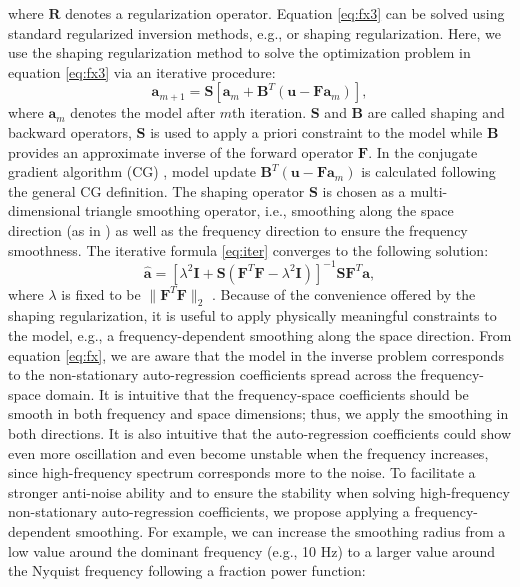 where $\mathbf{R}$ denotes a regularization operator. Equation \ref{eq:fx3} can be solved using standard regularized inversion methods, e.g., \cite{tikhonov1963} or shaping \cite[]{fomel2007shape} regularization. Here, we use the shaping regularization method to solve the optimization problem in equation \ref{eq:fx3} via an iterative procedure:
 \begin{equation}
\label{eq:iter}
\mathbf{a}_{m+1} = \mathbf{S}[\mathbf{a}_m + \mathbf{B}^T(\mathbf{u}-\mathbf{Fa}_m)] ,
\end{equation}
where $\mathbf{a}_{m}$ denotes the model after $m$th iteration. $\mathbf{S}$ and $\mathbf{B}$ are called shaping and backward operators, $\mathbf{S}$ is used to apply a priori constraint to the model while  $\mathbf{B}$ provides an approximate inverse of the forward operator $\mathbf{F}$. In the conjugate gradient algorithm (CG) \cite[]{fomel2007shape}, model update $\mathbf{B}^T(\mathbf{u}-\mathbf{Fa}_m)$ is calculated following the general CG definition. The shaping operator $\mathbf{S}$ is chosen as a multi-dimensional triangle smoothing operator, i.e., smoothing along the space direction (as in \cite{guochang2012}) as well as the frequency direction to ensure the frequency smoothness. The iterative formula  \ref{eq:iter} converges to the following solution:
\begin{equation}
\label{eq:fx33}
\hat{\mathbf{a}} = [\lambda^2\mathbf{I} + \mathbf{S}(\mathbf{F}^T\mathbf{F}-\lambda^2\mathbf{I}) ]^{-1}\mathbf{S}\mathbf{F}^T\mathbf{a},
\end{equation}
where $\lambda$ is fixed to be $\parallel\mathbf{F}^T\mathbf{F}\parallel_2$ \cite[]{fomel2007shape}. Because of the convenience offered by the shaping regularization, it is useful to apply physically meaningful constraints to the model, e.g., a frequency-dependent smoothing along the space direction. From equation \ref{eq:fx}, we are aware that the model in the inverse problem corresponds to the non-stationary auto-regression coefficients spread across the frequency-space domain. It is intuitive that the frequency-space coefficients should be smooth in both  frequency and space dimensions; thus, we apply the smoothing in both directions. It is also intuitive that the auto-regression coefficients could show even more oscillation and even become unstable when the frequency increases, since high-frequency spectrum corresponds more to the noise. To facilitate a stronger anti-noise ability and to ensure the stability when solving high-frequency non-stationary auto-regression coefficients, we propose applying a frequency-dependent smoothing. For example, we can increase the smoothing radius from a low value around the dominant frequency (e.g., 10 Hz) to a larger value around the Nyquist frequency following a fraction power function:

